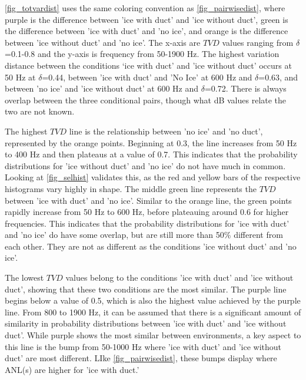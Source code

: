 \autoref{fig_totvardist} uses the same coloring convention as \autoref{fig_pairwisedist}, where purple is the difference between 'ice with duct' and 'ice without duct', green is the difference between 'ice with duct' and 'no ice', and orange is the difference between 'ice without duct' and 'no ice'. The x-axis are $TVD$ values ranging from $\delta$=0.1-0.8 and the y-axis is frequency from 50-1900 Hz. The highest variation distance between the conditions ‘ice with duct' and 'ice without duct’ occurs at 50 Hz at $\delta$=0.44, between 'ice with duct' and 'No Ice' at 600 Hz and $\delta$=0.63, and between 'no ice' and 'ice without duct' at 600 Hz and $\delta$=0.72. There is always overlap between the three conditional pairs, though what dB values relate the two are not known. 

The highest $TVD$ line is the relationship between 'no ice' and 'no duct', represented by the orange points. Beginning at 0.3, the line increases from 50 Hz to 400 Hz and then plateaus at a value of 0.7. This indicates that the probability distributions for 'ice without duct' and 'no ice' do not have much in common. Looking at \autoref{fig_selhist} validates this, as the red and yellow bars of the respective histograms vary highly in shape. The middle green line represents the $TVD$ between 'ice with duct' and 'no ice'. Similar to the orange line, the green points rapidly increase from 50 Hz to 600 Hz, before plateauing around 0.6 for higher frequencies. This indicates that the probability distributions for 'ice with duct' and 'no ice' do have some overlap, but are still more than 50\% different from each other. They are not as different as the conditions 'ice without duct' and 'no ice'. 

The lowest $TVD$ values belong to the conditions 'ice with duct' and 'ice without duct', showing that these two conditions are the most similar. The purple line begins below a value of 0.5, which is also the highest value achieved by the purple line. From 800 to 1900 Hz, it can be assumed that there is a significant amount of similarity in probability distributions between 'ice with duct' and 'ice without duct'. While purple shows the most similar between environments, a key aspect to this line is the bump from 50-1000 Hz where 'ice with duct' and 'ice without duct' are most different. LIke \autoref{fig_pairwisedist}, these bumps display where ANL(s) are higher for 'ice with duct.'


